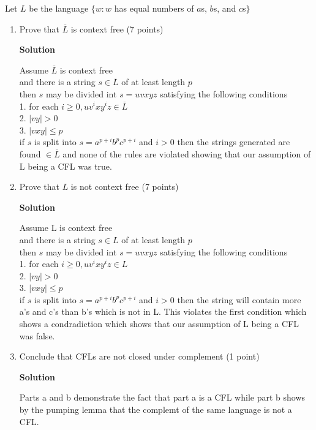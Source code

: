 \documentclass{article}
\begin{document}
\begin{empfile}
Let $L$ be the language $\{w: w$ has equal numbers of $a$s, $b$s,
and $c$s$\}$
 
\begin{enumerate}[\bfseries a.]
\item Prove that $\overline{L}$ is context free (7 points)

\textbf{Solution}

Assume $\overline{L}$ is context free \\
and there is a string $s \in \overline{L}$ of at least length $p$ \\
then $s$ may be divided int $s = uvxyz$ satisfying the following conditions \\

1. for each $i \ge 0, uv^ixy^iz \in \overline{L}$ \\
2. $|vy| > 0$ \\
3. $|vxy| \le p$ \\
$\ $ \\
if $s$ is split into $s = a^{p+i} b^p c^{p+i}$ and $i > 0$ then the strings generated are found $\in \overline{L}$ and none of the rules are violated showing that our assumption of L being a CFL was true. \\ 

\item Prove that $L$ is not context free  (7 points)

\textbf{Solution}

Assume L is context free \\
and there is a string $s \in L$ of at least length $p$ \\
then $s$ may be divided int $s = uvxyz$ satisfying the following conditions \\

1. for each $i \ge 0, uv^ixy^iz \in L$ \\
2. $|vy| > 0$ \\
3. $|vxy| \le p$ \\
$\ $ \\
if $s$ is split into $s = a^{p+i} b^p c^{p+i}$ and $i > 0$ 
then the string will contain more a's and c's than b's which is not in L.
This violates the first condition which shows a condradiction which shows that our assumption of L being a CFL was false. \\ 

\item Conclude that CFLs are not closed under complement (1 point)

\textbf{Solution}

Parts a and b demonstrate the fact that part a is a CFL while part b shows by the pumping lemma that the complemt of the same language is not a CFL. 



\end{enumerate}
\end{empfile}
\immediate{}
\end{document}
